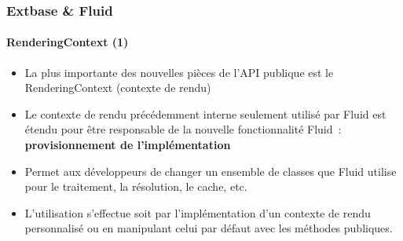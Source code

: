 
\begin{frame}[fragile]
	\frametitle{Extbase \& Fluid}
	\framesubtitle{RenderingContext (1)}

	\lstset{basicstyle=\tiny\ttfamily}

	\begin{itemize}

		\item La plus importante des nouvelles pièces de l'API publique est le RenderingContext
			(contexte de rendu)

		\item Le contexte de rendu précédemment interne seulement utilisé par Fluid
			est étendu pour être responsable de la nouvelle fonctionnalité Fluid~:
			\textbf{provisionnement de l'implémentation}

		\item Permet aux développeurs de changer un ensemble de classes que Fluid utilise
			pour le traitement, la résolution, le cache, etc.

		\item L'utilisation s'effectue soit par l'implémentation d'un contexte de rendu
			personnalisé ou en manipulant celui par défaut avec les méthodes publiques.

	\end{itemize}

\end{frame}


